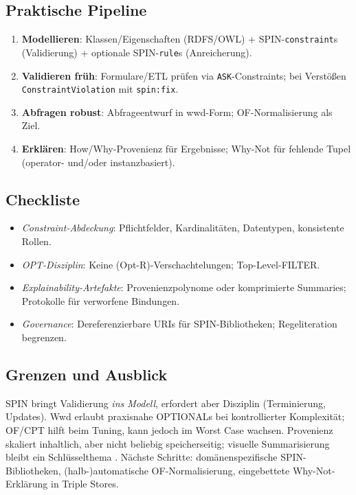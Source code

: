 \subsection{Praktische Pipeline}
\begin{enumerate}
  \item \textbf{Modellieren}: Klassen/Eigenschaften (RDFS/OWL) + SPIN-\texttt{constraint}s (Validierung) + optionale SPIN-\texttt{rule}s (Anreicherung).
  \item \textbf{Validieren früh}: Formulare/ETL prüfen via \texttt{ASK}-Constraints; bei Verstößen \texttt{ConstraintViolation} mit \texttt{spin:fix}.
  \item \textbf{Abfragen robust}: Abfrageentwurf in wwd-Form; OF-Normalisierung als Ziel.
  \item \textbf{Erklären}: How/Why-Provenienz für Ergebnisse; Why-Not für fehlende Tupel (operator- und/oder instanzbasiert).
\end{enumerate}

\subsection{Checkliste}
\begin{itemize}
  \item \emph{Constraint-Abdeckung}: Pflichtfelder, Kardinalitäten, Datentypen, konsistente Rollen.
  \item \emph{OPT-Disziplin}: Keine (Opt-R)-Verschachtelungen; Top-Level-FILTER.
  \item \emph{Explainability-Artefakte}: Provenienzpolynome oder komprimierte Summaries; Protokolle für verworfene Bindungen.
  \item \emph{Governance}: Dereferenzierbare URIs für SPIN-Bibliotheken; Regeliteration begrenzen.
\end{itemize}

\subsection{Grenzen und Ausblick}
SPIN bringt Validierung \emph{ins Modell}, erfordert aber Disziplin (Terminierung, Updates). Wwd erlaubt praxisnahe OPTIONALs bei kontrollierter Komplexität; OF/CPT hilft beim Tuning, kann jedoch im Worst Case wachsen. Provenienz skaliert inhaltlich, aber nicht beliebig speicherseitig; visuelle Summarisierung bleibt ein Schlüsselthema \cite{herschel-survey}. Nächste Schritte: domänenspezifische SPIN-Bibliotheken, (halb-)automatische OF-Normalisierung, eingebettete Why-Not-Erklärung in Triple Stores.







